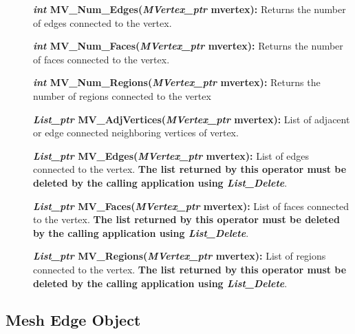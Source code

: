 \documentclass[12pt]{article}
\begin{document}
\begin{description}
\item[]{\bf {\em int} MV\_Num\_Edges({\em MVertex\_ptr} mvertex):}
Returns the number of edges connected to the vertex.

\item[]{\bf {\em int} MV\_Num\_Faces({\em MVertex\_ptr} mvertex):}
Returns the number of faces connected to the vertex.

\item[]{\bf {\em int} MV\_Num\_Regions({\em MVertex\_ptr} mvertex):}
Returns the number of regions connected to the vertex

\item[]{\bf {\em List\_ptr} MV\_AdjVertices({\em MVertex\_ptr}
mvertex):} List of adjacent or edge connected neighboring vertices of vertex.

\item[]{\bf {\em List\_ptr} MV\_Edges({\em MVertex\_ptr} mvertex):}
List of edges connected to the vertex. {\bf The list returned by this
  operator must be deleted by the calling application using {\em List\_Delete}}.

\item[]{\bf {\em List\_ptr} MV\_Faces({\em MVertex\_ptr} mvertex):}
List of faces connected to the vertex. {\bf The list returned by this
  operator must be deleted by the calling application using {\em List\_Delete}}.

\item[]{\bf {\em List\_ptr} MV\_Regions({\em MVertex\_ptr} mvertex):}
List of regions connected to the vertex. {\bf The list returned by this
  operator must be deleted by the calling application using {\em List\_Delete}}.
\end{description}



\newpage
\subsection{Mesh Edge Object}
\end{document}
